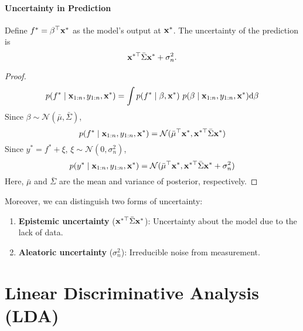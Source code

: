 \paragraph{Uncertainty in Prediction}
	Define $f^* = \beta^\top \mathbf{x}^*$ as the model's output at $\mathbf{x}^*$. The uncertainty of the prediction is $$\mathbf{x}^{*\top}{\bar\Sigma} \mathbf{x}^* + \sigma_n^2.$$
\begin{proof}
\begin{equation}
	p(f^* \mid \mathbf{x}_{1:n}, y_{1:n}, \mathbf{x}^*) = \int p(f^*\mid \beta, \mathbf{x}^*)\ p(\beta \mid \mathbf{x}_{1:n}, y_{1:n}, \mathbf{x}^*) \mathrm{d} \beta
\end{equation}
Since $\beta \sim \mathcal{N}(\bar{\mu}, \bar{\Sigma})$,
\begin{equation}
	p(f^* \mid \mathbf{x}_{1:n}, y_{1:n}, \mathbf{x}^*) = \mathcal{N}({\bar\mu}^\top \mathbf{x}^*, \mathbf{x}^{*\top}{\bar\Sigma} \mathbf{x}^*)
\end{equation}
Since $y^* = f^* + \xi$, $\xi \sim \mathcal{N}(0, \sigma_n^2)$,
\begin{equation}
	p(y^* \mid \mathbf{x}_{1:n}, y_{1:n}, \mathbf{x}^*) = \mathcal{N}({\bar\mu}^\top \mathbf{x}^*, \mathbf{x}^{*\top}{\bar\Sigma} \mathbf{x}^* + \sigma_n^2)
\end{equation}
Here, $\bar{{\mu}}$ and $\bar{{\Sigma}}$ are the mean and variance of posterior, respectively.
\end{proof}

Moreover, we can distinguish two forms of uncertainty:
\begin{enumerate}
	\item \textbf{Epistemic uncertainty} ($\mathbf{x}^{*\top}{\bar\Sigma} \mathbf{x}^*$): Uncertainty about the model due to the lack of data.
	\item \textbf{Aleatoric uncertainty} ($\sigma_n^2$): Irreducible noise from measurement.
\end{enumerate}

\section{Linear Discriminative Analysis (LDA)}
